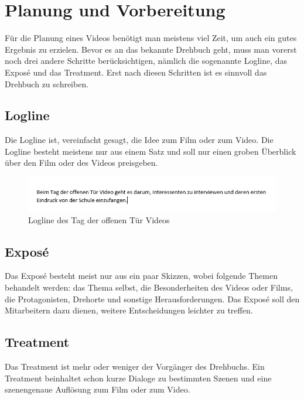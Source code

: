 \section{Planung und Vorbereitung}
Für die Planung eines Videos benötigt man meistens viel Zeit, um auch ein gutes Ergebnis zu erzielen. Bevor es an das bekannte Drehbuch geht, muss man vorerst noch drei andere Schritte berücksichtigen, nämlich die sogenannte Logline, das Expos\'{e} und das Treatment. Erst nach diesen Schritten ist es sinnvoll das Drehbuch zu schreiben.\citep{planung}
\subsection{Logline}
Die Logline ist, vereinfacht gesagt, die Idee zum Film oder zum Video. Die Logline besteht meistens nur aus einem Satz und soll nur einen groben Überblick über den Film oder des Videos preisgeben.\citep{logline}
\begin{figure}[H]
	\centering
	\includegraphics[width=1.0\textwidth]{abb26} 
	\caption{Logline des Tag der offenen Tür Videos}
\end{figure}
\subsection{Expos\'{e}}
Das Expos\'{e} besteht meist nur aus ein paar Skizzen, wobei folgende Themen behandelt werden: das Thema selbst, die Besonderheiten des Videos oder Films, die Protagonisten, Drehorte und sonstige Herausforderungen. Das Expos\'{e} soll den Mitarbeitern dazu dienen, weitere Entscheidungen leichter zu treffen.\citep{expose}
\subsection{Treatment}
Das Treatment ist mehr oder weniger der Vorgänger des Drehbuchs. Ein Treatment beinhaltet schon kurze Dialoge zu bestimmten Szenen und eine szenengenaue Auflösung zum Film oder zum Video.\citep{treatment}
